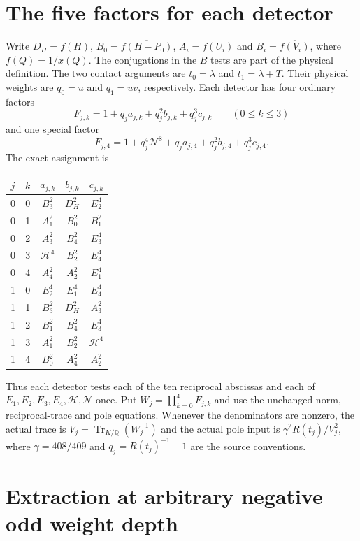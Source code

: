 \documentclass[11pt,a4paper]{article}
\newcommand{\Q}{\mathbb Q}\newcommand{\Z}{\mathbb Z}
\begin{document}
\section{The five factors for each detector}

Write $D_H=f(H)$, $B_0=\overline{f(H-P_0)}$,
$A_i=f(U_i)$ and $B_i=\overline{f(V_i)}$, where $f(Q)=1/x(Q)$.
The conjugations in the $B$ tests are part of the physical definition.
The two contact arguments are $t_0=\lambda$ and $t_1=\lambda+T$.
Their physical weights are $q_0=u$ and $q_1=uv$, respectively.
Each detector has four ordinary factors
\[
 F_{j,k}=1+q_j a_{j,k}+q_j^2 b_{j,k}+q_j^3 c_{j,k}
 \qquad(0\le k\le3)
\]
and one special factor
\[
 F_{j,4}=1+q_j^4\mathcal N^8
                +q_j a_{j,4}+q_j^2 b_{j,4}+q_j^3 c_{j,4}.
\]
The exact assignment is
\begin{center}
\begin{tabular}{ccccc}
\toprule
$j$&$k$&$a_{j,k}$&$b_{j,k}$&$c_{j,k}$\\
\midrule
0&0&$B_3^2$&$D_H^2$&$E_2^4$\\
0&1&$A_1^2$&$B_0^2$&$B_1^2$\\
0&2&$A_3^2$&$B_4^2$&$E_3^4$\\
0&3&$\mathcal H^4$&$B_2^2$&$E_4^4$\\
0&4&$A_4^2$&$A_2^2$&$E_1^4$\\
\midrule
1&0&$E_2^4$&$E_1^4$&$E_4^4$\\
1&1&$B_3^2$&$D_H^2$&$A_3^2$\\
1&2&$B_1^2$&$B_4^2$&$E_3^4$\\
1&3&$A_1^2$&$B_2^2$&$\mathcal H^4$\\
1&4&$B_0^2$&$A_4^2$&$A_2^2$\\
\bottomrule
\end{tabular}
\end{center}
Thus each detector tests each of the ten reciprocal abscissas and
each of $E_1,E_2,E_3,E_4,\mathcal H,\mathcal N$ once. Put
$W_j=\prod_{k=0}^4F_{j,k}$ and use the unchanged norm, reciprocal-trace
and pole equations. Whenever the denominators are nonzero, the actual
trace is $V_j=\operatorname{Tr}_{K/\Q}(W_j^{-1})$ and the actual
pole input is $\gamma^2 R(t_j)/V_j^2$, where $\gamma=408/409$
and $q_j=R(t_j)^{-1}-1$ are the source conventions.

\section{Extraction at arbitrary negative odd weight depth}
\end{document}
